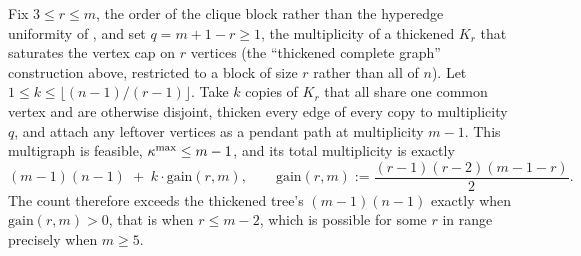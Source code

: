 \begin{conjecture}\label{thm:clique-chain-vertex}
Fix $3 \le r \le m$, the order of the clique block rather than the hyperedge uniformity of , and set $q = m+1-r \ge 1$, the multiplicity of a thickened $K_r$ that saturates the vertex cap on $r$ vertices (the ``thickened complete graph'' construction above, restricted to a block of size $r$ rather than all of $n$). Let $1 \le k \le \lfloor (n-1)/(r-1) \rfloor$. Take $k$ copies of $K_r$ that all share one common vertex and are otherwise disjoint, thicken every edge of every copy to multiplicity $q$, and attach any leftover vertices as a pendant path at multiplicity $m-1$. This multigraph is feasible, $\kappa^{\max} \le m-1$, and its total multiplicity is exactly
\[
    (m-1)(n-1) \;+\; k \cdot \mathrm{gain}(r,m),
    \qquad
    \mathrm{gain}(r,m) := \frac{(r-1)(r-2)(m-1-r)}{2}.
\]
The count therefore exceeds the thickened tree's $(m-1)(n-1)$ exactly when
$\mathrm{gain}(r,m) > 0$, that is when $r \le m-2$, which is possible for some $r$
in range precisely when $m \ge 5$.
\end{conjecture}

